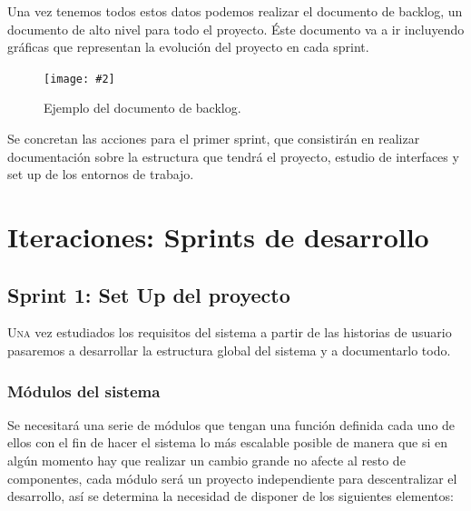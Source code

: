 \documentclass[12pt,a4paper,spanish]{book} %
\newcommand{\imgCentradaGrande}[3]{
\begin{figure}[H]
\begin{center}
\texttt{[image: \#2]}
\caption{#3}
\label{#1}
\end{center}
\end{figure}
}
\begin{document}
Una vez tenemos todos estos datos podemos realizar el documento de backlog, un documento de alto nivel para todo el proyecto. Éste documento va a ir incluyendo gráficas que representan la evolución del proyecto en cada sprint.

\imgCentradaGrande{fig.3.1}{img/documentobacklog.eps}{Ejemplo del documento de backlog.}

Se concretan las acciones para el primer sprint, que consistirán en realizar documentación sobre la estructura que tendrá el proyecto, estudio de interfaces y set up de los entornos de trabajo.



\newpage

\chapter{Iteraciones: Sprints de desarrollo}

\section{Sprint 1: Set Up del proyecto}

\lettrine{U}{na} vez estudiados los requisitos del sistema a partir de las historias de usuario pasaremos a desarrollar la estructura global del sistema y a documentarlo todo. 

\subsection{Módulos del sistema}

Se necesitará una serie de módulos que tengan una función definida cada uno de ellos con el fin de hacer el sistema lo más escalable posible de manera que si en algún momento hay que realizar un cambio grande no afecte al resto de componentes, cada módulo será un proyecto independiente para descentralizar el desarrollo, así se determina la necesidad de disponer de los siguientes elementos:
\end{document}
